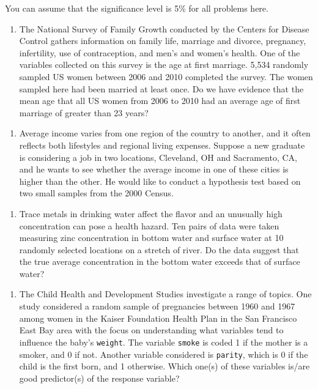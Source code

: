 \documentclass[]{article}
\providecommand{\tightlist}{%
  \setlength{\itemsep}{0pt}\setlength{\parskip}{0pt}}
\begin{document}
You can assume that the significance level is 5\% for all problems here.

\begin{enumerate}
\def\labelenumi{\arabic{enumi}.}
\tightlist
\item
  The National Survey of Family Growth conducted by the Centers for
  Disease Control gathers information on family life, marriage and
  divorce, pregnancy, infertility, use of contraception, and men's and
  women's health. One of the variables collected on this survey is the
  age at first marriage. 5,534 randomly sampled US women between 2006
  and 2010 completed the survey. The women sampled here had been married
  at least once. Do we have evidence that the mean age that all US women
  from 2006 to 2010 had an average age of first marriage of greater than
  23 years?
\end{enumerate}

\begin{enumerate}
\def\labelenumi{\arabic{enumi}.}
\setcounter{enumi}{1}
\tightlist
\item
  Average income varies from one region of the country to another, and
  it often reflects both lifestyles and regional living expenses.
  Suppose a new graduate is considering a job in two locations,
  Cleveland, OH and Sacramento, CA, and he wants to see whether the
  average income in one of these cities is higher than the other. He
  would like to conduct a hypothesis test based on two small samples
  from the 2000 Census.
\end{enumerate}

\begin{enumerate}
\def\labelenumi{\arabic{enumi}.}
\setcounter{enumi}{2}
\tightlist
\item
  Trace metals in drinking water affect the flavor and an unusually high
  concentration can pose a health hazard. Ten pairs of data were taken
  measuring zinc concentration in bottom water and surface water at 10
  randomly selected locations on a stretch of river. Do the data suggest
  that the true average concentration in the bottom water exceeds that
  of surface water?
\end{enumerate}

\begin{enumerate}
\def\labelenumi{\arabic{enumi}.}
\setcounter{enumi}{3}
\tightlist
\item
  The Child Health and Development Studies investigate a range of
  topics. One study considered a random sample of pregnancies between
  1960 and 1967 among women in the Kaiser Foundation Health Plan in the
  San Francisco East Bay area with the focus on understanding what
  variables tend to influence the baby's \texttt{weight}. The variable
  \texttt{smoke} is coded 1 if the mother is a smoker, and 0 if not.
  Another variable considered is \texttt{parity}, which is 0 if the
  child is the first born, and 1 otherwise. Which one(s) of these
  variables is/are good predictor(s) of the response variable?
\end{enumerate}
\end{document}
